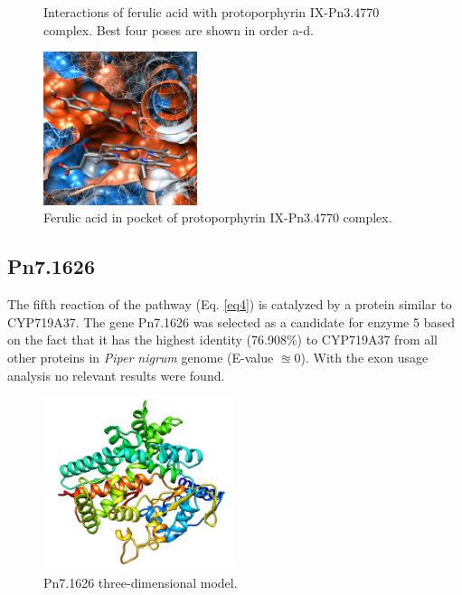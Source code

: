 \documentclass[12pt]{article}
\begin{document}
\begin{figure}[h!]
\begin{subfigure}[h!]{0.35\textwidth}
			\caption{}
		\end{subfigure}
		\hfill
		\caption[Interactions between ferulic acid and protoporphyrin IX-Pn3.4770 complex.]{Interactions of ferulic acid with protoporphyrin IX-Pn3.4770 complex. Best four poses are shown in order a-d.}
		\label{fig5k_6}
	\end{figure}
	\FloatBarrier
	
	\FloatBarrier
	\begin{figure}[h!]
		\centering
		\includegraphics[width=0.4\textwidth]{../5/known/Dock/Dock2/chimera.png}
		\caption{Ferulic acid in pocket of protoporphyrin IX-Pn3.4770 complex.}
		\label{fig5k_7}
	\end{figure}
	\FloatBarrier
	
	\subsection{Pn7.1626}
	
	The fifth reaction of the pathway (Eq. \ref{eq4}) is catalyzed by a protein similar to CYP719A37. The gene Pn7.1626 was selected as a candidate for enzyme 5 based on the fact that it has the highest identity (76.908\%) to CYP719A37 from all other proteins in \textit{Piper nigrum} genome (E-value $\approxeq 0$). With the exon usage analysis no relevant results were found.
	
	\FloatBarrier
	\begin{figure}
		\centering
		\includegraphics[width=0.5\textwidth]{../5/propose/Minimize/model2.png}
		\caption{Pn7.1626 three-dimensional model.}
		\label{fig5p_1}
	\end{figure}
	\FloatBarrier
	
\end{document}
